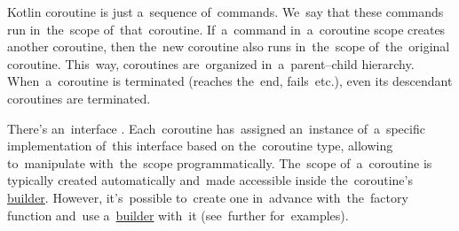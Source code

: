 \label{kotlincoroutinescope}
Kotlin coroutine is just a~sequence of~commands.
We~say that these commands run in~the~scope of~that~coroutine.
If~a~command in~a~coroutine scope creates another coroutine, then the~new coroutine also runs in~the~scope of~the~original coroutine.
This~way, coroutines are~organized in~a~parent--child hierarchy.
When~a~coroutine is terminated (reaches the~end, fails~etc.), even its descendant coroutines are terminated.

There's an~interface .
Each~coroutine has~assigned an~instance of~a~specific implementation of~this interface based on the~coroutine type, allowing to~manipulate with~the~scope programmatically.
The~scope of~a~coroutine is typically created automatically and~made accessible inside the~coroutine's \hyperref[kotlincoroutinebuilder]{builder}.
However, it's~possible to~create one in~advance with~the~factory function  and~use a~\hyperref[kotlincoroutinebuilder]{builder} with~it (see~further for~examples).
